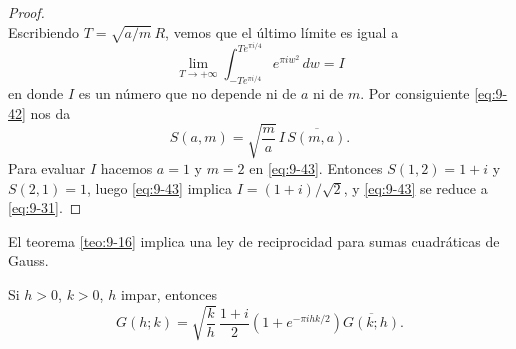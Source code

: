 \documentclass[12pt,a4paper]{book}
\begin{document}
\begin{proof}
\begin{equation}
        \end{equation}
        Escribiendo $T=\sqrt{a/m}\,R$, vemos que el último límite es igual a
        \begin{equation*}
            \lim_{T\to+\infty}\int_{-Te^{\pi i/4}}^{Te^{\pi i/4}}e^{\pi iw^{2}}\,dw=I
        \end{equation*}
        en donde $I$ es un número que no depende ni de $a$ ni de $m$. Por consiguiente
        \eqref{eq:9-42} nos da
        \begin{equation}\label{eq:9-43}
            S(a,m)=\sqrt{\frac{m}{a}}\,I\,\overline{S(m,a)}.
        \end{equation}
        Para evaluar $I$ hacemos $a=1$ y $m=2$ en \eqref{eq:9-43}. Entonces $S(1,2)=1+i$ y
        $S(2,1)=1$, luego \eqref{eq:9-43} implica $I=(1+i)/\sqrt{2}$, y \eqref{eq:9-43} se
        reduce a \eqref{eq:9-31}.
    \end{proof}

    El teorema \ref{teo:9-16} implica una ley de reciprocidad para sumas cuadráticas de
    Gauss.

    \begin{teorema}\label{teo:9-17}
        Si $h>0$, $k>0$, $h$ impar, entonces
        \begin{equation}\label{eq:9-44}
            G(h;k)=\sqrt{\frac{k}{h}}\,\frac{1+i}{2}\left(1+e^{-\pi ihk/2}\right)\overline{G(k;h)}.
        \end{equation}
    \end{teorema}
\end{document}
